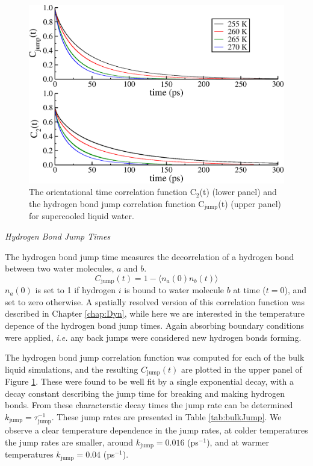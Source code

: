 \begin{figure}
\includegraphics[width=\linewidth]{Figures/jump_lcorr}
\caption{\label{fig:jump_lcorr} The orientational time correlation
  function C$_2$(t) (lower panel) and the hydrogen bond jump
  correlation function C$_\mathrm{jump}$(t) (upper panel) for
  supercooled liquid water. }
\end{figure}                


\begin{flushleft}
\textit{Hydrogen Bond Jump Times}
\end{flushleft}
The hydrogen bond jump time measures the decorrelation of a hydrogen
bond between two water molecules, $a$ and $b$. 
\begin{equation}\label{jump}
C_\mathrm{jump}(t) = 1 - \langle n_a(0) n_b(t) \rangle
\end{equation}
$n_a(0)$ is set to 1 if hydrogen $i$ is bound to water molecule $b$ at
time ($t=0$), and set to zero otherwise. A spatially resolved version
of this correlation function was described in Chapter \ref{chap:Dyn},
while here we are interested in the temperature depence of the
hydrogen bond jump times. Again absorbing boundary conditions were
applied, \textit{i.e.} any back jumps were considered new hydrogen
bonds forming.

The hydrogen bond jump correlation function was computed for each of
the bulk liquid simulations, and the resulting $C_\mathrm{jump}(t)$
are plotted in the upper panel of Figure \ref{fig:jump_lcorr}. These
were found to be well fit by a single exponential decay, with a decay
constant describing the jump time for breaking and making hydrogen
bonds. From these characterstic decay times the jump rate can be
determined $k_\mathrm{jump} = \tau_\mathrm{jump}^{-1}$. These jump
rates are presented in Table \ref{tab:bulkJump}. We observe a clear
temperature dependence in the jump rates, at colder temperatures the
jump rates are smaller, around $k_\mathrm{jump} = 0.016$ (ps$^{-1}$),
and at warmer temperatures $k_\mathrm{jump} = 0.04$ (ps$^{-1}$).

